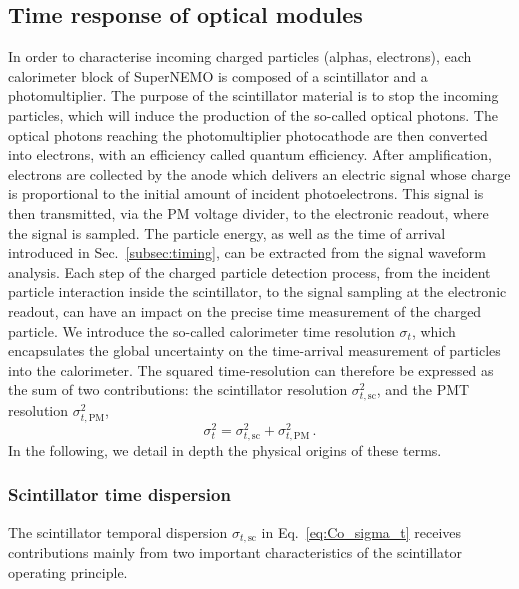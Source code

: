 \subsection{Time response of optical modules}
\label{subsec:OMtimeResponse}

In order to characterise incoming charged particles (alphas, electrons), each calorimeter block of SuperNEMO is composed of a scintillator and a photomultiplier.
The purpose of the scintillator material is to stop the incoming particles, which will induce the production of the so-called optical photons.
The optical photons reaching the photomultiplier photocathode are then converted into electrons, with an efficiency called quantum efficiency.
After amplification, electrons are collected by the anode which delivers an electric signal whose charge is proportional to the initial amount of incident photoelectrons.
This signal is then transmitted, via the PM voltage divider, to the electronic readout, where the signal is sampled.
The particle energy, as well as the time of arrival introduced in Sec.~\ref{subsec:timing}, can be extracted from the signal waveform analysis.
Each step of the charged particle detection process, from the incident particle interaction inside the scintillator, to the signal sampling at the electronic readout, can have an impact on the precise time measurement of the charged particle.
We introduce the so-called calorimeter time resolution $\sigma_t$, which encapsulates the global uncertainty on the time-arrival measurement of particles into the calorimeter.
The squared time-resolution can therefore be expressed as the sum of two contributions:
the scintillator resolution $\sigma_{t, \textrm{sc}}^{2}$, and the PMT resolution $\sigma_{t, \textrm{PM}}^{2}$,
\begin{equation}
  \sigma_{t}^{2}=\sigma_{t,\text{sc}}^{2}+\sigma_{t,\text{PM}}^{2}\,.
  \label{eq:Co_sigma_t}
\end{equation}
In the following, we detail in depth the physical origins of these terms.

\subsubsection*{Scintillator time dispersion}
The scintillator temporal dispersion $\sigma_{t,\text{sc}}$ in Eq.~\eqref{eq:Co_sigma_t} receives contributions mainly from two important characteristics of the scintillator operating principle.


